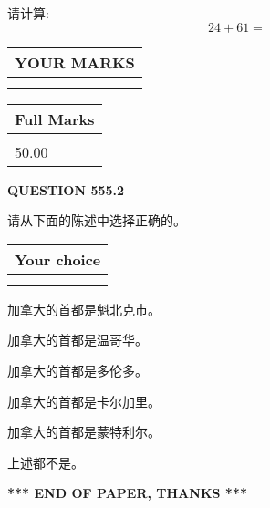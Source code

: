 \documentclass{ctexart}
\begin{document}
  
 
请计算:
\begin{equation}
24 +  %
61 = \nonumber
\end{equation}
 

 

 
  
\vspace{0.2in}
  
\noindent\begin{tabular}{|l|}
\hline
 YOUR MARKS  \\
\hline
 \\ 
 \\ 
\hline
\end{tabular}
\hspace{0.05in} \begin{tabular}{|l|}
\hline
 Full Marks  \\
\hline
 \\ 
50.00 \\
\hline
\end{tabular}
{\textbf{\Large{QUESTION
555.2 
}}}
  
  
请从下面的陈述中选择正确的。
  
  
\noindent\hspace{3.0in} \begin{tabular}{|l|}
\hline
Your choice \\
\hline
 \\ 
 \\ 
\hline
\end{tabular}
  
  
 
 
加拿大的首都是魁北克市。
 
 
加拿大的首都是温哥华。
 
 
加拿大的首都是多伦多。
 
 
加拿大的首都是卡尔加里。
 
 
加拿大的首都是蒙特利尔。
 
 
 上述都不是。
 
 
   
   
 \vspace{0.2in}
 
   
   
   
   
\vspace{1.0in} 
{\textbf{\large{ *** END OF PAPER, THANKS *** }}} 
   
\end{document}
